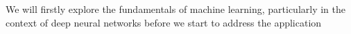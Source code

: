 We will firstly explore the fundamentals of machine learning, particularly in the context of deep neural networks before we start to address the application